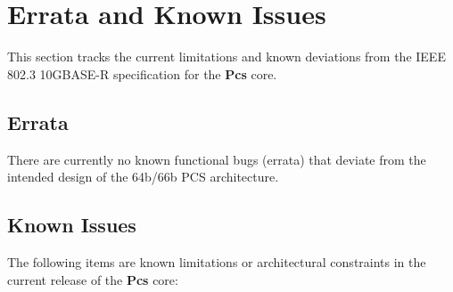 \section{Errata and Known Issues}

This section tracks the current limitations and known deviations from the IEEE 802.3 10GBASE-R specification for the \textbf{Pcs} core.

\subsection{Errata}
There are currently no known functional bugs (errata) that deviate from the intended design of the 64b/66b PCS architecture.

\subsection{Known Issues}

The following items are known limitations or architectural constraints in the current release of the \textbf{Pcs} core:

